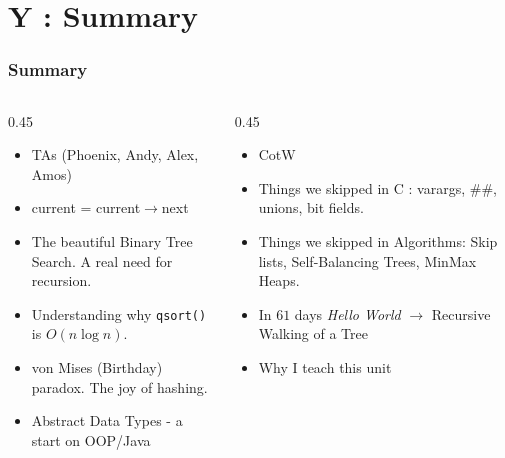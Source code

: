 \section{Y : Summary}
\label{chap:summary}


\begin{frame}[fragile]
\frametitle{Summary}
\begin{columns}[T]

\begin{column}{0.45\textwidth}
\begin{itemize}[<+->]
\item TAs (Phoenix, Andy, Alex, Amos)
\item current = current$\rightarrow$next
\item The beautiful Binary Tree Search. A real need for recursion.
\item Understanding why {\tt qsort()} is $O(n \log n)$.
\item von Mises (Birthday) paradox. The joy of hashing.
\item Abstract Data Types - a start on OOP/Java
\end{itemize}
\end{column}

\pause
\begin{column}{0.45\textwidth}
\begin{itemize}[<+->]
\item CotW
\item Things we skipped in C : varargs, $\#\#$, unions, bit fields.
\item Things we skipped in Algorithms: Skip lists, Self-Balancing Trees, MinMax Heaps.
\item In $61$ days {\it Hello World} $\rightarrow$ Recursive Walking of a Tree
\item Why I teach this unit
\end{itemize}
\end{column}

\end{columns}
\end{frame}
